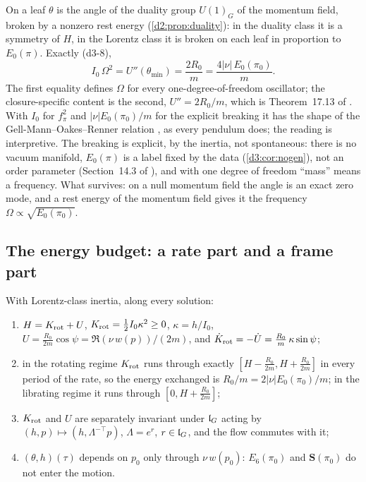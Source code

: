 \begin{remark}
\label{d3:rem:goldstone}
On a leaf $\theta$ is the angle of the duality group $U(1)_G$ of the momentum field, broken by a nonzero rest energy (\cref{d2:prop:duality}): in
the duality class it is a symmetry of $H$, in the Lorentz class it is broken on each leaf in proportion to $E_0(\pi)$. Exactly (d3-8),
\[
I_0\,\Omega^2=U''(\theta_{\min})=\frac{2R_0}m=\frac{4|\nu|\,E_0(\pi_0)}m .
\]
The first equality defines $\Omega$ for every one-degree-of-freedom oscillator; the closure-specific content is the second, $U''=2R_0/m$, which is
Theorem~17.13 of \cite{ES17}. With $I_0$ for $f_\pi^2$ and $|\nu|E_0(\pi_0)/m$ for the explicit breaking it has the shape of the
Gell-Mann--Oakes--Renner relation \cite{GellMannOakesRenner68,Weinberg72}, as every pendulum does; the reading is interpretive. The breaking is
explicit, by the inertia, not spontaneous: there is no vacuum manifold, $E_0(\pi)$ is a label fixed by the data (\cref{d3:cor:nogen}), not an order
parameter (Section~14.3 of \cite{ES17}), and with one degree of freedom ``mass'' means a frequency. What survives: on a null momentum field the angle
is an exact zero mode, and a rest energy of the momentum field gives it the frequency $\Omega\propto\sqrt{E_0(\pi_0)}$.
\end{remark}

\subsection{The energy budget: a rate part and a frame part}
\label{d3:sec:budget}

\begin{proposition}
\label{d3:prop:budget}
With Lorentz-class inertia, along every solution:
\begin{enumerate}[label=(\roman*),leftmargin=2.2em]
\item $H=K_{\rm rot}+U$, $K_{\rm rot}=\tfrac12I_0\kappa^2\ge0$, $\kappa=h/I_0$, $U=\tfrac{R_0}{2m}\cos\psi=\Re(\nu\,w(p))/(2m)$, and
$\dot K_{\rm rot}=-\dot U=\tfrac{R_0}m\,\kappa\sin\psi$;
\item in the rotating regime $K_{\rm rot}$ runs through exactly $[H-\tfrac{R_0}{2m},H+\tfrac{R_0}{2m}]$ in every period of the rate, so the energy exchanged
is $R_0/m=2|\nu|E_0(\pi_0)/m$; in the librating regime it runs through $[0,H+\tfrac{R_0}{2m}]$;
\item $K_{\rm rot}$ and $U$ are separately invariant under $\mathfrak l_G$ acting by $(h,p)\mapsto(h,\Lambda^{-\top}p)$, $\Lambda=e^r$, $r\in\mathfrak l_G$, and the flow
commutes with it;
\item $(\theta,h)(\tau)$ depends on $p_0$ only through $\nu\,w(p_0)$: $E_6(\pi_0)$ and $\mathbf S(\pi_0)$ do not enter the motion.
\end{enumerate}
\end{proposition}

